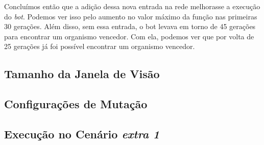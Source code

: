 Concluímos então que a adição dessa nova entrada na rede melhorasse a execução
do \textit{bot}. Podemos ver isso pelo aumento no valor máximo da função nas
primeiras 30 gerações. Além disso, sem essa entrada, o bot levava em torno de
45 gerações para encontrar um organismo vencedor. Com ela, podemos ver que por
volta de 25 gerações já foi possível encontrar um organismo vencedor.

\subsection{\label{section:experiment-vision}Tamanho da Janela de Visão}


\subsection{Configurações de Mutação}


\subsection{Execução no Cenário \textit{extra 1}}


